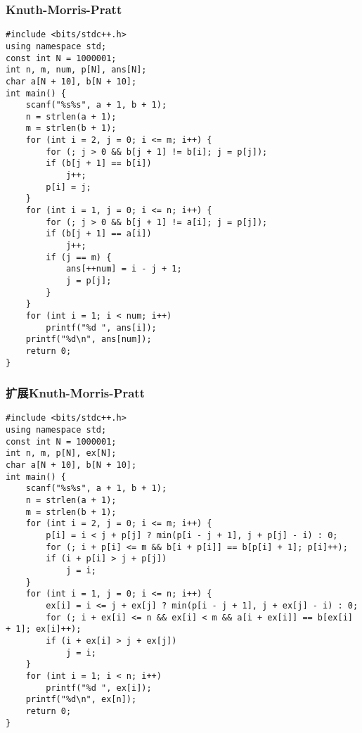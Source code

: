 ﻿\documentclass[a4paper]{article}
\begin{document}
\subsubsection{Knuth-Morris-Pratt}
\begin{lstlisting}
#include <bits/stdc++.h>
using namespace std;
const int N = 1000001;
int n, m, num, p[N], ans[N];
char a[N + 10], b[N + 10];
int main() {
    scanf("%s%s", a + 1, b + 1);
    n = strlen(a + 1);
    m = strlen(b + 1);
    for (int i = 2, j = 0; i <= m; i++) {
        for (; j > 0 && b[j + 1] != b[i]; j = p[j]);
        if (b[j + 1] == b[i])
            j++;
        p[i] = j;
    }
    for (int i = 1, j = 0; i <= n; i++) {
        for (; j > 0 && b[j + 1] != a[i]; j = p[j]);
        if (b[j + 1] == a[i])
            j++;
        if (j == m) {
            ans[++num] = i - j + 1;
            j = p[j];
        }
    }
    for (int i = 1; i < num; i++)
        printf("%d ", ans[i]);
    printf("%d\n", ans[num]);
    return 0;
}
\end{lstlisting}
\subsubsection{扩展Knuth-Morris-Pratt}
\begin{lstlisting}
#include <bits/stdc++.h>
using namespace std;
const int N = 1000001;
int n, m, p[N], ex[N];
char a[N + 10], b[N + 10];
int main() {
    scanf("%s%s", a + 1, b + 1);
    n = strlen(a + 1);
    m = strlen(b + 1);
    for (int i = 2, j = 0; i <= m; i++) {
        p[i] = i < j + p[j] ? min(p[i - j + 1], j + p[j] - i) : 0;
        for (; i + p[i] <= m && b[i + p[i]] == b[p[i] + 1]; p[i]++);
        if (i + p[i] > j + p[j])
            j = i;
    }
    for (int i = 1, j = 0; i <= n; i++) {
        ex[i] = i <= j + ex[j] ? min(p[i - j + 1], j + ex[j] - i) : 0;
        for (; i + ex[i] <= n && ex[i] < m && a[i + ex[i]] == b[ex[i] + 1]; ex[i]++);
        if (i + ex[i] > j + ex[j])
            j = i;
    }
    for (int i = 1; i < n; i++)
        printf("%d ", ex[i]);
    printf("%d\n", ex[n]);
    return 0;
}
\end{lstlisting}
\end{document}
